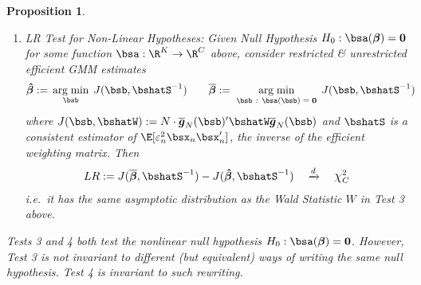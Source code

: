 \documentclass[12pt]{article}
\theoremstyle{plain}
\newtheorem{prop}[thm]{Proposition}
\theoremstyle{definition}
\theoremstyle{remark}
\newcommand*{\Chi}{\mbox{\large$\chi$}} %
\newcommand{\ra}{\rightarrow}
\newcommand{\bsbeta}{\boldsymbol{\beta}}
\newcommand{\bshatbeta}{\boldsymbol{\hat{\beta}}}
\newcommand{\bsbarbeta}{\boldsymbol{\overline{\beta}}}
\newcommand{\bsbarg}{\boldsymbol{\overline{g}}}
\renewcommand{\bso}{\boldsymbol{0}}
\DeclareMathOperator*{\argmin}{arg\;min}
\newcommand{\dto}{\xrightarrow{d}}
\begin{document}
\begin{prop}
\begin{enumerate}
  \item \emph{LR Test for Non-Linear Hypotheses}:
    Given Null Hypothesis $H_0: \bsa(\bsbeta) = \bso$ for some function
    $\bsa:\R^K\ra \R^C$ above, consider restricted \& unrestricted
    efficient GMM estimates
    \begin{align*}
      \bshatbeta
      :=&\; \argmin_{\bsb}\; J(\bsb, \bshatS^{-1})
      \qquad
      \bsbarbeta
      :=\; \argmin_{\text{$\bsb$ \emph{:} $\bsa(\bsb) = \bso$}}\;
      J(\bsb, \bshatS^{-1})
    \end{align*}
    where
    $J(\bsb, \bshatW) := N\cdot \bsbarg_N(\bsb)' \bshatW \bsbarg_N(\bsb)$
    and $\bshatS$ is a consistent estimator
    of $\E[\varepsilon_n^2\bsx_n\bsx_n']$, the inverse of the efficient
    weighting matrix. Then
    \begin{align*}
      LR := J(\bsbarbeta, \bshatS^{-1}) - J(\bshatbeta, \bshatS^{-1})
      \quad \dto \quad \Chi^2_C
    \end{align*}
    i.e.\ it has the same asymptotic distribution as the Wald Statistic
    $W$ in Test 3 above.
\end{enumerate}
Tests 3 and 4 both test the nonlinear null hypothesis
$H_0:\bsa(\bsbeta)=\bso$. However, Test 3 is \emph{not} invariant to
different (but equivalent) ways of writing the same null hypothesis.
Test 4 \emph{is} invariant to such rewriting.
\end{prop}
\end{document}
